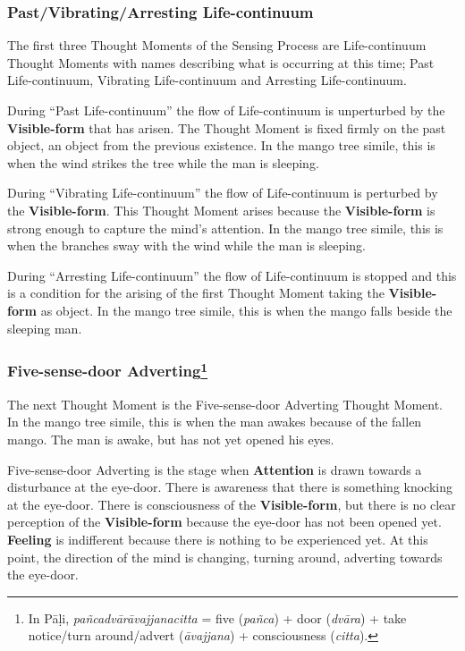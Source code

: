 \subsubsection*{Past/Vibrating/Arresting Life-continuum}

The first three Thought Moments of the Sensing Process are Life-continuum Thought Moments with names describing what is occurring at this time; Past Life-continuum, Vibrating Life-continuum and Arresting Life-continuum.

During “Past Life-continuum” the flow of Life-continuum is unperturbed by the \textbf{Visible-form} that has arisen. The Thought Moment is fixed firmly on the past object, an object from the previous existence. In the mango tree simile, this is when the wind strikes the tree while the man is sleeping.

During “Vibrating Life-continuum” the flow of Life-continuum is perturbed by the \textbf{Visible-form}. This Thought Moment arises because the \textbf{Visible-form} is strong enough to capture the mind’s attention. In the mango tree simile, this is when the branches sway with the wind while the man is sleeping.

During “Arresting Life-continuum” the flow of Life-continuum is stopped and this is a condition for the arising of the first Thought Moment taking the \textbf{Visible-form} as object. In the mango tree simile, this is when the mango falls beside the sleeping man.

\subsubsection*{Five-sense-door Adverting\footnote{In Pāḷi, \textit{pañcadvārāvajjanacitta} = five (\textit{pañca}) + door (\textit{dvāra}) + take notice/turn around/advert (\textit{āvajjana}) + consciousness (\textit{citta}).}}

The next Thought Moment is the Five-sense-door Adverting Thought Moment. In the mango tree simile, this is when the man awakes because of the fallen mango. The man is awake, but has not yet opened his eyes. 

Five-sense-door Adverting is the stage when \textbf{Attention} is drawn towards a disturbance at the eye-door. There is awareness that there is something knocking at the eye-door. There is consciousness of the \textbf{Visible-form}, but there is no clear perception of the \textbf{Visible-form} because the eye-door has not been opened yet. \textbf{Feeling} is indifferent because there is nothing to be experienced yet. At this point, the direction of the mind is changing, turning around, adverting towards the eye-door.

